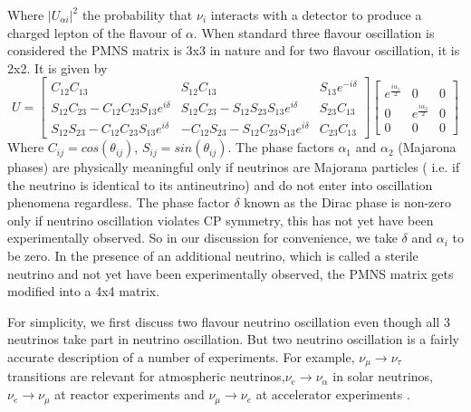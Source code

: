 \documentclass[12pt,a4paper]{report}
\begin{document}
Where $|U_{\alpha i}|^{2}$ the probability that $\nu_{i}$ interacts with a detector to produce a charged lepton of the flavour of $\alpha$. When standard three flavour oscillation is considered the PMNS matrix is 3x3 in nature and for two flavour oscillation, it is 2x2. It is given by
\begin{equation}
\label{eq:0c}
U = \begin{bmatrix} C_{12}C_{13} & S_{12}C_{13} & S_{13}e^{-i\delta} \\
S_{12}C_{23}-C_{12}C_{23}S_{13}e^{i\delta} & S_{12}C_{23}-S_{12}S_{23}S_{13}e^{i\delta}& S_{23}C_{13}\\
S_{12}S_{23}-C_{12}C_{23}S_{13}e^{i\delta}& -C_{12}S_{23}-S_{12}C_{23}S_{13}e^{i\delta}&C_{23}C_{13} \end{bmatrix} \begin{bmatrix}
e^{\frac{i\alpha_{1}}{2}}&0&0\\0& e^{\frac{i\alpha_{2}}{2}}&0\\0&0&0\end{bmatrix}
\end{equation}
Where $C_{ij}=cos(\theta_{ij})$, $S_{ij}=sin(\theta_{ij})$. The phase factors $\alpha_{1}$ and $\alpha_{2}$ (Majarona phases) are physically meaningful only if neutrinos are Majorana particles ( i.e. if the neutrino is identical to its antineutrino) and do not enter into oscillation phenomena regardless. The phase factor $\delta$ known as the Dirac phase is non-zero only if neutrino oscillation violates CP symmetry, this has not yet have been experimentally observed. So in our discussion for convenience, we take $\delta$ and $\alpha_{i}$ to be zero. In the presence of an additional neutrino, which is called a sterile neutrino and not yet have been experimentally observed, the PMNS matrix gets modified into a 4x4 matrix.\par

For simplicity, we first discuss two flavour neutrino oscillation even though all 3 neutrinos take part in neutrino oscillation. But two neutrino oscillation is a fairly accurate description of a number of experiments. For example, $\nu_{\mu} \rightarrow \nu_{\tau}$ transitions are relevant for atmospheric neutrinos,$\nu_{e}\rightarrow \nu_{\alpha}$ in solar neutrinos, $\nu_{e}\rightarrow\nu_{\mu}$  at reactor experiments and $\nu_{\mu} \rightarrow \nu_{e}$ at accelerator experiments \cite{blasone2009}.\par
\end{document}

